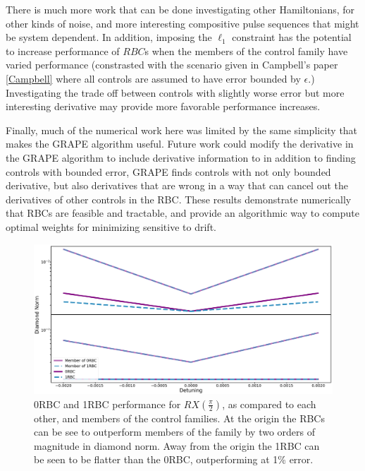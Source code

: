 \documentclass[aps,nofootinbib,pra,notitlepage,twocolumn]{revtex4-1}
\begin{document}
There is much more work that can be done investigating other Hamiltonians, for other kinds of noise, and more interesting compositive pulse sequences that might be system dependent. In addition, imposing the $\ell_1$ constraint has the potential to increase performance of $RBC$s when the members of the control family have varied performance (constrasted with the scenario given in Campbell's paper \ref{Campbell} where all controls are assumed to have error bounded by $\epsilon$.) Investigating the trade off between controls with slightly worse error but more interesting derivative may provide more favorable performance increases.

Finally, much of the numerical work here was limited by the same simplicity that makes the GRAPE algorithm useful. Future work could modify the derivative in the GRAPE algorithm to include derivative information to in addition to finding controls with bounded error, GRAPE finds controls with not only bounded derivative, but also derivatives that are wrong in a way that can cancel out the derivatives of other controls in the RBC. These results demonstrate numerically that RBCs are feasible and tractable, and provide an algorithmic way to compute optimal weights for minimizing sensitive to drift.

\begin{figure}[htb]
  \centering
  \includegraphics[scale=.2]{figures/2QRBC}

\caption{0RBC and 1RBC performance for $RX(\frac{\pi}{2})$, as compared to each other, and members of the control families. At the origin the RBCs can be see to outperform members of the family by two orders of magnitude in diamond norm. Away from the origin the 1RBC can be seen to be flatter than the 0RBC, outperforming at 1\% error.}
\end{figure}
\end{document}

